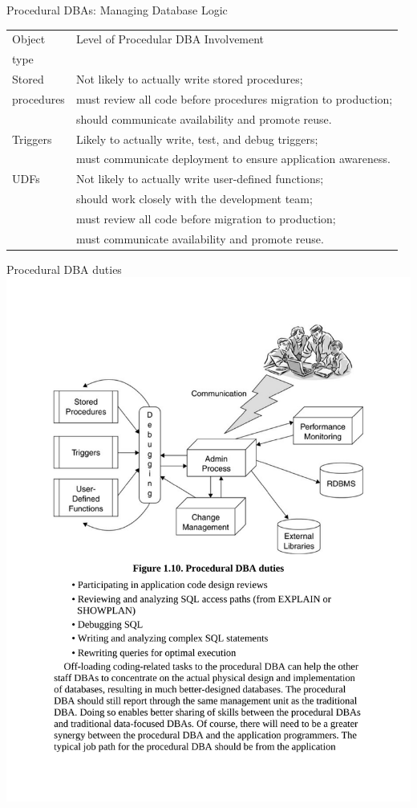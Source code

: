 \documentclass{beamer}
\begin{document}
\begin{frame}{Procedural DBAs: Managing Database Logic}
    \footnotesize
    \centering
    \begin{tabular}{ l l }
        \toprule
        Object & Level of Procedular DBA Involvement \\
        type & \\
        \midrule
        Stored  & Not likely to actually write stored procedures; \\
        procedures & must review all code before procedures migration to production; \\
        & should communicate availability and promote reuse. \\
        Triggers & Likely to actually write, test, and debug triggers; \\
        &must communicate deployment to ensure application awareness. \\
        UDFs & Not likely to actually write user-defined functions; \\
        & should work closely with the development team; \\
        & must review all code before migration to production; \\
        & must communicate availability and promote reuse. \\
        \bottomrule
    \end{tabular}
\end{frame}

\begin{frame}{Procedural DBA duties}
    \centering
    \includegraphics[width=\textwidth, trim={2.50cm 13.00cm 2.50cm 2.40cm}, clip]{figures/dba_duties}
\end{frame}
\end{document}
